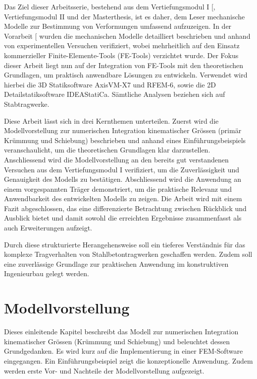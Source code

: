 \documentclass[
  11pt,
  letterpaper,
]{scrreprt}
\begin{document}
Das Ziel dieser Arbeitsserie, bestehend aus dem Vertiefungsmodul I
{[}\citeproc{ref-gitz_ansatze_2024}{1}{]}, Vertiefungsmodul II und der
Masterthesis, ist es daher, dem Leser mechanische Modelle zur Bestimmung
von Verformungen umfassend aufzuzeigen. In der Vorarbeit
{[}\citeproc{ref-gitz_ansatze_2024}{1}{]} wurden die mechanischen
Modelle detailliert beschrieben und anhand von experimentellen Versuchen
verifiziert, wobei mehrheitlich auf den Einsatz kommerzieller
Finite-Elemente-Tools (FE-Tools) verzichtet wurde. Der Fokus dieser
Arbeit liegt nun auf der Integration von FE-Tools mit den theoretischen
Grundlagen, um praktisch anwendbare Lösungen zu entwickeln. Verwendet
wird hierbei die 3D Statiksoftware AxisVM-X7 und RFEM-6, sowie die 2D
Detailstatiksoftware IDEAStatiCa. Sämtliche Analysen beziehen sich auf
Stabtragwerke.

Diese Arbeit lässt sich in drei Kernthemen unterteilen. Zuerst wird die
Modellvorstellung zur numerischen Integration kinematischer Grössen
(primär Krümmung und Schiebung) beschrieben und anhand eines
Einführungsbeispiels veranschaulicht, um die theoretischen Grundlagen
klar darzustellen. Anschliessend wird die Modellvorstellung an den
bereits gut verstandenen Versuchen aus dem Vertiefungsmodul I
verifiziert, um die Zuverlässigkeit und Genauigkeit des Modells zu
bestätigen. Abschliessend wird die Anwendung an einem vorgespannten
Träger demonstriert, um die praktische Relevanz und Anwendbarkeit des
entwickelten Modells zu zeigen. Die Arbeit wird mit einem Fazit
abgeschlossen, das eine differenzierte Betrachtung zwischen Rückblick
und Ausblick bietet und damit sowohl die erreichten Ergebnisse
zusammenfasst als auch Erweiterungen aufzeigt.

Durch diese strukturierte Herangehensweise soll ein tieferes Verständnis
für das komplexe Tragverhalten von Stahlbetontragwerken geschaffen
werden. Zudem soll eine zuverlässige Grundlage zur praktischen Anwendung
im konstruktiven Ingenieurbau gelegt werden.


\chapter{Modellvorstellung}\label{modellvorstellung}

Dieses einleitende Kapitel beschreibt das Modell zur numerischen
Integration kinematischer Grössen (Krümmung und Schiebung) und
beleuchtet dessen Grundgedanken. Es wird kurz auf die Implementierung in
einer FEM-Software eingegangen. Ein Einführungsbeispiel zeigt die
konzeptionelle Anwendung. Zudem werden erste Vor- und Nachteile der
Modellvorstellung aufgezeigt.
\end{document}

